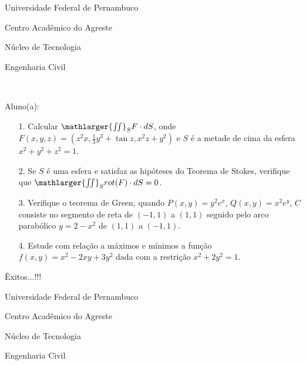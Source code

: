 \documentclass[oneside,a4paper,12pt]{article}
\newcommand{\universidade}{Universidade Federal de Pernambuco}
\newcommand{\centro}{Centro Acadêmico do Agreste}
\newcommand{\departamento}{Núcleo de Tecnologia}
\newcommand{\curso}{Engenharia Civil}
\begin{document}
	\pagestyle{empty}
	
	\begin{center}
	 	\vspace{0pt}
	 	
		\universidade
		\par
		\centro
		\par
		\departamento
		\par
		\curso
		\par
		\vspace{08pt}
		\\
	\end{center}
	
	
	\begin{flushleft}
		Aluno(a):
	\end{flushleft}
	
\begin{itemize}
\item[1.] Calcular $\mathlarger{\iint}_{S}F\cdot dS$, onde $F(x,y,z)=(z^{2}x,\frac{1}{3}y^{3}+\tan z, x^{2}z+y^{2})$ e $S$ é a metade de cima da esfera $x^{2}+y^{2}+z^{2}=1$.
\end{itemize}
\begin{itemize}
\item[2.] Se $S$ é uma esfera e satisfaz as hipóteses do Teorema de Stokes, verifique que  $\mathlarger{\iint}_{S}rot (F)\cdot dS=0$. 
 \end{itemize}
 \begin{itemize}
\item [3.] Verifique o teorema de Green, quando $P(x,y)=y^{2}e^{x}$, $Q(x,y)=x^{2}e^{y}$, $C$ consiste no segmento de reta de $(-1,1)$ a $(1,1)$ seguido pelo arco parabólico $y=2-x^{2}$ de $(1,1)$ a $(-1,1)$.
\end{itemize}
\begin{itemize}
\item[4.] Estude com relação a máximos e mínimos a função $f(x,y)=x^{2}-2xy+3y^{2}$ dada com a restrição $x^{2}+2y^{2}=1$.
\end{itemize}

	\flushbottom
	\flushright
     Êxitos...!!!
     \begin{center}
     	\vspace{50pt}
     	
     	\universidade
     	\par
     	\centro
     	\par
     	\departamento
     	\par
     	\curso
     	\par
     	\vspace{08pt}
     	\\
     \end{center}
     
\end{document}
